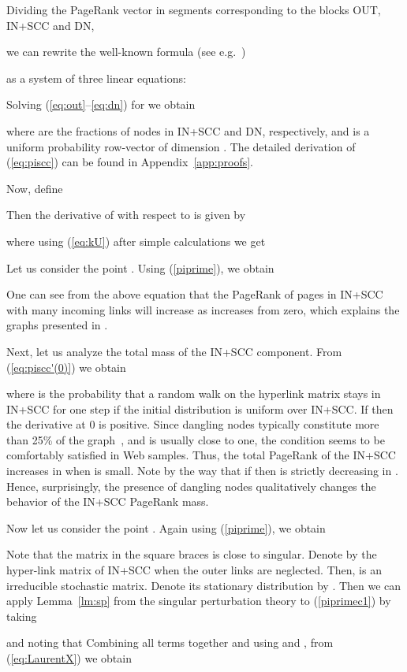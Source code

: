 \documentclass{article}
\begin{document}
Dividing the PageRank vector in segments corresponding to the
blocks OUT, IN+SCC and DN,

we can rewrite the well-known formula (see e.g.~\cite{Moler})

as a system of three linear equations:

Solving (\ref{eq:out}--\ref{eq:dn}) for  we obtain

where 
are the fractions of nodes in IN+SCC and DN, respectively, and
 is a uniform probability row-vector of
dimension . The detailed derivation of (\ref{eq:piscc})
can be found in Appendix~\ref{app:proofs}.

Now, define

Then the derivative of  with respect to  is given by

where using (\ref{eq:kU}) after simple calculations we get

Let us consider the point . Using (\ref{piprime}), we obtain

One can see from the above equation that the PageRank of pages in
IN+SCC with many incoming links will increase as  increases from
zero, which explains the graphs presented in \cite{Boldi05}.

Next, let us analyze the total mass of the IN+SCC component. From
(\ref{eq:piscc'(0)}) we obtain

where  is the probability that a random walk on
the hyperlink matrix stays in IN+SCC for one step if the initial
distribution is uniform over IN+SCC.  If  then the
derivative at 0 is positive. Since dangling nodes typically
constitute more than 25\% of the graph~\cite{Eiron04}, and 
is usually close to one, the condition  seems to be
comfortably satisfied in Web samples. Thus, the total PageRank
of the IN+SCC increases in  when  is small. Note by the way
that if  then  is strictly decreasing in .
Hence, surprisingly, the presence of dangling
nodes qualitatively changes the behavior of the IN+SCC PageRank
mass.

Now let us consider the point . Again using (\ref{piprime}),
we obtain

Note that the matrix in the square braces is close to singular.
Denote by  the hyper-link matrix of IN+SCC when the outer
links are neglected. Then,  is an irreducible stochastic
matrix. Denote its stationary distribution by .
Then we can apply Lemma~\ref{lm:sp} from the singular perturbation
theory to (\ref{piprimec1}) by taking

and noting that  Combining all terms
together and using 
and , from (\ref{eq:LaurentX}) we obtain
\end{document}
